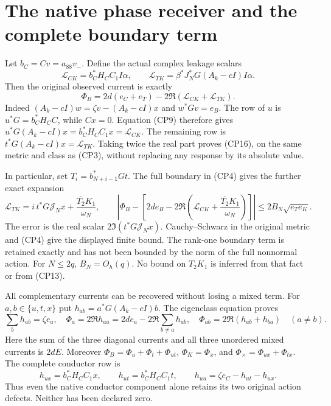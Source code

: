 \documentclass[11pt]{article}
\begin{document}
\section{The native phase receiver and the complete boundary term}
Let $b_C=Cv=a_{88}v_-$. Define the actual complex leakage scalars
\begin{equation}\tag{CP15}
 \mathcal L_{CK}=b_C^*H_C C_1I\alpha,\qquad
 \mathcal L_{TK}=\beta^*J_N^*G(A_k-cI)I\alpha.
\end{equation}
Then the original observed current is exactly
\begin{equation}\tag{CP16}
 \boxed{\Phi_B=2d(e_C+e_T)-2\Re(\mathcal L_{CK}+\mathcal L_{TK}).}
\end{equation}
Indeed $(A_k-cI)w=\zeta v-(A_k-cI)x$ and $w^*Gv=e_B$.
The row of $u$ is $u^*G=b_C^*H_CC$, while $Cx=0$.
Equation (CP9) therefore gives
$u^*G(A_k-cI)x=b_C^*H_CC_1x=\mathcal L_{CK}$.
The remaining row is $t^*G(A_k-cI)x=\mathcal L_{TK}$.
Taking twice the real part proves (CP16), on the same metric and class
as (CP3), without replacing any response by its absolute value.

In particular, set $T_i=b_{N+i-1}^*Gt$. The full boundary in (CP4)
gives the further exact expansion
\begin{equation}\tag{CP17}
 \mathcal L_{TK}=i\,t^*G\mathcal J_Nx+
                    \frac{\overline{T_2}K_1}{\omega_N},
 \qquad
 \left|\Phi_B-\left[2d e_B-2\Re\left(
 \mathcal L_{CK}+\frac{\overline{T_2}K_1}{\omega_N}\right)\right]\right|
 \le2B_N\sqrt{e_Te_K}.
\end{equation}
The error is the real scalar $2\Im(t^*G\mathcal J_Nx)$.
Cauchy--Schwarz in the original metric and (CP4) give the displayed
finite bound. The rank-one boundary term is retained exactly and
has not been bounded by the norm of the full nonnormal action.
For $N\le2q$, $B_N=O_h(q)$. No bound on $T_2K_1$ is inferred
from that fact or from (CP13).

All complementary currents can be recovered without losing a mixed term.
For $a,b\in\{u,t,x\}$ put $h_{ab}=a^*G(A_k-cI)b$.
The eigenclass equation proves
\begin{equation}\tag{CP18}
 \sum_bh_{ab}=\zeta e_a,\quad
 \Phi_a=2\Re h_{aa}=2d e_a-2\Re\sum_{b\ne a}h_{ab},\quad
 \Phi_{ab}=2\Re(h_{ab}+h_{ba})\quad(a\ne b).
\end{equation}
Here the sum of the three diagonal currents and all three unordered
mixed currents is $2dE$. Moreover
$\Phi_B=\Phi_u+\Phi_t+\Phi_{ut}$,
$\Phi_K=\Phi_x$, and
$\Phi_{\times}=\Phi_{ux}+\Phi_{tx}$.
The complete conductor row is
\[
 h_{ux}=b_C^*H_CC_1x,\qquad h_{ut}=b_C^*H_CC_1t,\qquad
 h_{uu}=\zeta e_C-h_{ut}-h_{ux}.
\]
Thus even the native conductor component alone retains its two original
action defects. Neither has been declared zero.
\end{document}
